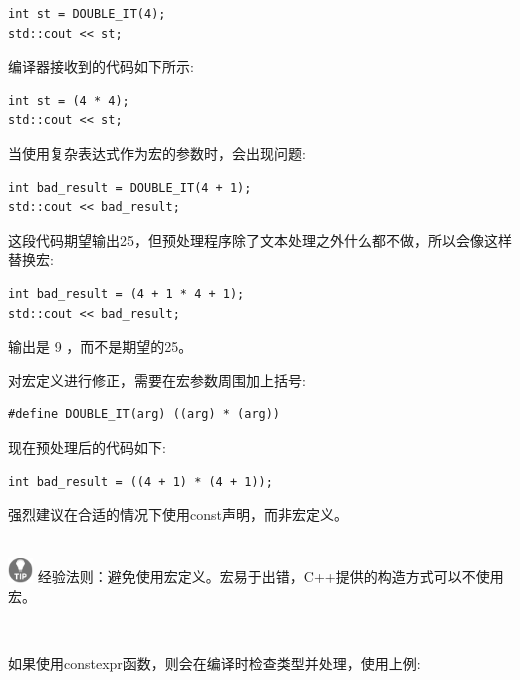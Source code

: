 \begin{lstlisting}[caption={}]
int st = DOUBLE_IT(4);
std::cout << st;
\end{lstlisting}

编译器接收到的代码如下所示: \par

\begin{lstlisting}[caption={}]
int st = (4 * 4);
std::cout << st;
\end{lstlisting}

当使用复杂表达式作为宏的参数时，会出现问题: \par

\begin{lstlisting}[caption={}]
int bad_result = DOUBLE_IT(4 + 1);
std::cout << bad_result;
\end{lstlisting}

这段代码期望输出25，但预处理程序除了文本处理之外什么都不做，所以会像这样替换宏:\par

\begin{lstlisting}[caption={}]
int bad_result = (4 + 1 * 4 + 1);
std::cout << bad_result;
\end{lstlisting}

输出是 9 ，而不是期望的25。 \par
对宏定义进行修正，需要在宏参数周围加上括号:\par

\begin{lstlisting}[caption={}]
#define DOUBLE_IT(arg) ((arg) * (arg))
\end{lstlisting}

现在预处理后的代码如下: \par

\begin{lstlisting}[caption={}]
int bad_result = ((4 + 1) * (4 + 1));
\end{lstlisting}

强烈建议在合适的情况下使用const声明，而非宏定义。 \par

\hspace*{\fill} \\ %
\includegraphics[width=0.05\textwidth]{images/tip}
经验法则：避免使用宏定义。宏易于出错，C++提供的构造方式可以不使用宏。 \par

\noindent\textbf{}\ \par
如果使用constexpr函数，则会在编译时检查类型并处理，使用上例: \par

